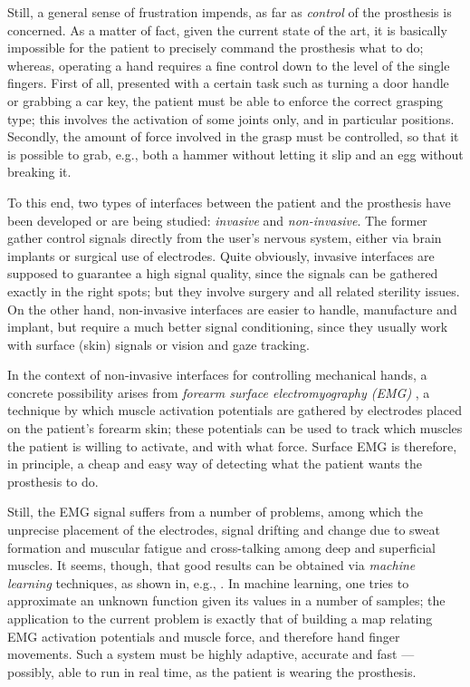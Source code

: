 Still, a general sense of frustration impends, as far as
\emph{control} of the prosthesis is concerned. As a matter of fact,
given the current state of the art, it is basically impossible for the
patient to precisely command the prosthesis what to do; whereas,
operating a hand requires a fine control down to the level of the
single fingers. First of all, presented with a certain task such as
turning a door handle or grabbing a car key, the patient must be able
to enforce the correct grasping type; this involves the activation of
some joints only, and in particular positions. Secondly, the amount of
force involved in the grasp must be controlled, so that it is possible
to grab, e.g., both a hammer without letting it slip and an egg
without breaking it.

To this end, two types of interfaces between the patient and the
prosthesis have been developed or are being studied: \emph{invasive}
and \emph{non-invasive}. The former gather control signals directly
from the user's nervous system, either via brain implants or surgical
use of electrodes. Quite obviously, invasive interfaces are supposed
to guarantee a high signal quality, since the signals can be gathered
exactly in the right spots; but they involve surgery and all related
sterility issues. On the other hand, non-invasive interfaces are
easier to handle, manufacture and implant, but require a much better
signal conditioning, since they usually work with surface (skin)
signals or vision and gaze tracking.

In the context of non-invasive interfaces for controlling mechanical
hands, a concrete possibility arises from \emph{forearm surface
electromyography (EMG)} \cite{zecca}, a technique by which muscle
activation potentials are gathered by electrodes placed on the
patient's forearm skin; these potentials can be used to track which
muscles the patient is willing to activate, and with what force.
Surface EMG is therefore, in principle, a cheap and easy way of
detecting what the patient wants the prosthesis to do.

Still, the EMG signal suffers from a number of problems, among which
the unprecise placement of the electrodes, signal drifting and change
due to sweat formation and muscular fatigue and cross-talking among
deep and superficial muscles. It seems, though, that good results can
be obtained via \emph{machine learning} techniques, as shown in, e.g.,
\cite{smagt}. In machine learning, one tries to approximate an unknown
function given its values in a number of samples; the application to
the current problem is exactly that of building a map relating EMG
activation potentials and muscle force, and therefore hand finger
movements. Such a system must be highly adaptive, accurate and fast
--- possibly, able to run in real time, as the patient is wearing the
prosthesis.

